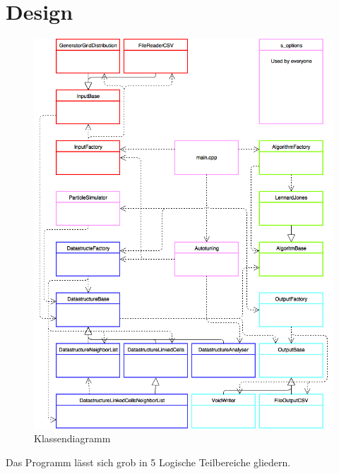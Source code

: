 \documentclass[
	12pt,
	a4paper,
	BCOR10mm,
	DIV14,
	headsepline,
]{scrreprt}
\begin{document}
\section{Design}
	\begin{figure}[h]
		\centering
		\includegraphics[height=0.6\textheight]{ClassDiagram.png}
		\caption{Klassendiagramm}
		\label{figure:Klassendiagramm}
	\end{figure}
	Das Programm lässt sich grob in 5 Logische Teilbereiche gliedern.
\end{document}
